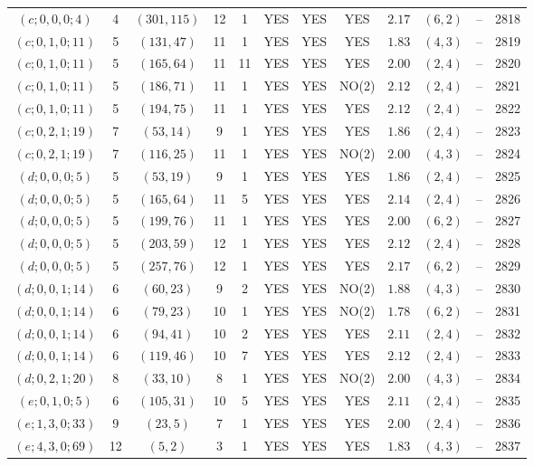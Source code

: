 \begin{longtable}{|c|c|c|c|c|c|c|c|c|c|c|c|}
$(c;0,0,0;4)$ & 4 & $(301,115)$ & 12 & 1 & YES & YES & YES & $2.17$ & $(6,2)$ & -- & 2818\\
$(c;0,1,0;11)$ & 5 & $(131,47)$ & 11 & 1 & YES & YES & YES & $1.83$ & $(4,3)$ & -- & 2819\\
$(c;0,1,0;11)$ & 5 & $(165,64)$ & 11 & 11 & YES & YES & YES & $2.00$ & $(2,4)$ & -- & 2820\\
$(c;0,1,0;11)$ & 5 & $(186,71)$ & 11 & 1 & YES & YES & NO(2) & $2.12$ & $(2,4)$ & -- & 2821\\
$(c;0,1,0;11)$ & 5 & $(194,75)$ & 11 & 1 & YES & YES & YES & $2.12$ & $(2,4)$ & -- & 2822\\
$(c;0,2,1;19)$ & 7 & $(53,14)$ & 9 & 1 & YES & YES & YES & $1.86$ & $(2,4)$ & -- & 2823\\
$(c;0,2,1;19)$ & 7 & $(116,25)$ & 11 & 1 & YES & YES & NO(2) & $2.00$ & $(4,3)$ & -- & 2824\\
$(d;0,0,0;5)$ & 5 & $(53,19)$ & 9 & 1 & YES & YES & YES & $1.86$ & $(2,4)$ & -- & 2825\\
$(d;0,0,0;5)$ & 5 & $(165,64)$ & 11 & 5 & YES & YES & YES & $2.14$ & $(2,4)$ & -- & 2826\\
$(d;0,0,0;5)$ & 5 & $(199,76)$ & 11 & 1 & YES & YES & YES & $2.00$ & $(6,2)$ & -- & 2827\\
$(d;0,0,0;5)$ & 5 & $(203,59)$ & 12 & 1 & YES & YES & YES & $2.12$ & $(2,4)$ & -- & 2828\\
$(d;0,0,0;5)$ & 5 & $(257,76)$ & 12 & 1 & YES & YES & YES & $2.17$ & $(6,2)$ & -- & 2829\\
$(d;0,0,1;14)$ & 6 & $(60,23)$ & 9 & 2 & YES & YES & NO(2) & $1.88$ & $(4,3)$ & -- & 2830\\
$(d;0,0,1;14)$ & 6 & $(79,23)$ & 10 & 1 & YES & YES & NO(2) & $1.78$ & $(6,2)$ & -- & 2831\\
$(d;0,0,1;14)$ & 6 & $(94,41)$ & 10 & 2 & YES & YES & YES & $2.11$ & $(2,4)$ & -- & 2832\\
$(d;0,0,1;14)$ & 6 & $(119,46)$ & 10 & 7 & YES & YES & YES & $2.12$ & $(2,4)$ & -- & 2833\\
$(d;0,2,1;20)$ & 8 & $(33,10)$ & 8 & 1 & YES & YES & NO(2) & $2.00$ & $(4,3)$ & -- & 2834\\
$(e;0,1,0;5)$ & 6 & $(105,31)$ & 10 & 5 & YES & YES & YES & $2.11$ & $(2,4)$ & -- & 2835\\
$(e;1,3,0;33)$ & 9 & $(23,5)$ & 7 & 1 & YES & YES & YES & $2.00$ & $(2,4)$ & -- & 2836\\
$(e;4,3,0;69)$ & 12 & $(5,2)$ & 3 & 1 & YES & YES & YES & $1.83$ & $(4,3)$ & -- & 2837\\

\end{longtable}
